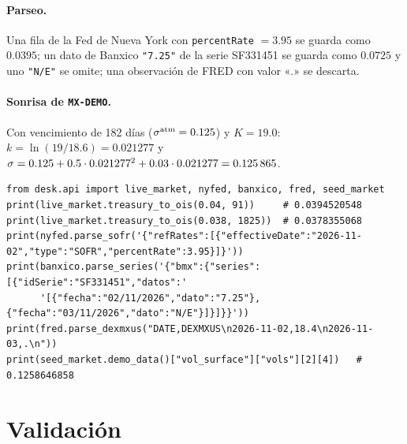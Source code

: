 \begin{sloppypar}
\paragraph{Parseo.} Una fila de la Fed de Nueva York con \texttt{percentRate} $=3.95$ se guarda como $0.0395$;
un dato de Banxico \texttt{"7.25"} de la serie SF331451 se guarda como $0.0725$ y uno \texttt{"N/E"} se omite; una
observación de FRED con valor «.» se descarta.

\paragraph{Sonrisa de \texttt{MX-DEMO}.} Con vencimiento de 182 días ($\sigma^{\mathrm{atm}}=0.125$) y $K=19.0$:
$k=\ln(19/18.6)=0.021277$ y $\sigma=0.125+0.5\cdot0.021277^2+0.03\cdot0.021277=\num{0.125865}$.

\begin{lstlisting}
from desk.api import live_market, nyfed, banxico, fred, seed_market
print(live_market.treasury_to_ois(0.04, 91))     # 0.0394520548
print(live_market.treasury_to_ois(0.038, 1825))  # 0.0378355068
print(nyfed.parse_sofr('{"refRates":[{"effectiveDate":"2026-11-02","type":"SOFR","percentRate":3.95}]}'))
print(banxico.parse_series('{"bmx":{"series":[{"idSerie":"SF331451","datos":'
      '[{"fecha":"02/11/2026","dato":"7.25"},{"fecha":"03/11/2026","dato":"N/E"}]}]}}'))
print(fred.parse_dexmxus("DATE,DEXMXUS\n2026-11-02,18.4\n2026-11-03,.\n"))
print(seed_market.demo_data()["vol_surface"]["vols"][2][4])   # 0.1258646858
\end{lstlisting}

\section{Validación}\label{sec:cap13-validacion}


\end{sloppypar}
